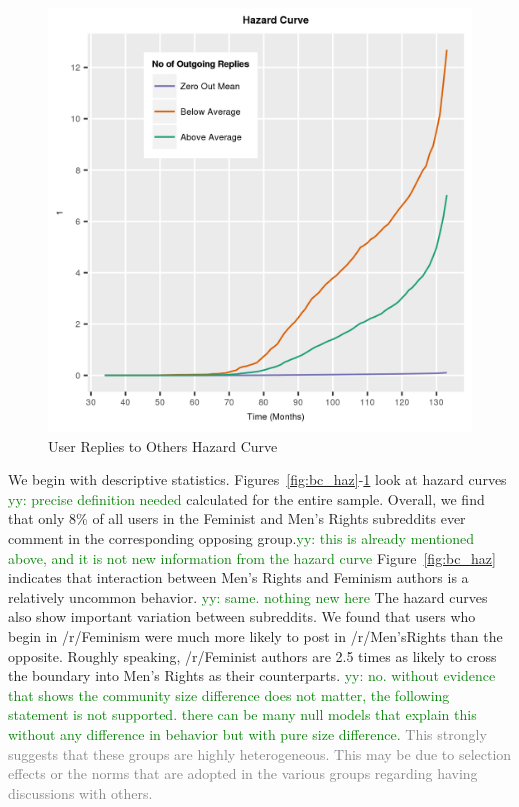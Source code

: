 \documentclass[letterpaper]{article}
\newcommand{\yy}[1]{{\textcolor{green}{yy: #1}}}
\newcommand{\del}[1]{{\textcolor{gray}{#1}}}
\begin{document}
\begin{figure}[ht]{}
\centering
    \includegraphics[scale=0.75]{outmean_Hazard_final}
    \caption{User Replies to Others Hazard Curve}
    \label{fig:outmean_haz}
\end{figure}

We begin with descriptive statistics. Figures~\ref{fig:bc_haz}-\ref{fig:outmean_haz} look at hazard curves \yy{precise definition needed} calculated for the entire sample. Overall, we find that only 8\% of all users in the Feminist and Men's Rights subreddits ever comment in the corresponding opposing group.\yy{this is already mentioned above, and it is not new information from the hazard curve} Figure~\ref{fig:bc_haz} indicates that interaction between Men's Rights and Feminism authors is a relatively uncommon behavior. \yy{same. nothing new here} The hazard curves also show important variation between subreddits. We found that users who begin in /r/Feminism were much more likely to post in /r/Men'sRights than the opposite.  Roughly speaking, /r/Feminist authors are 2.5 times as likely to cross the boundary into Men's Rights as their counterparts. \yy{no. without evidence that shows the community size difference does not matter, the following statement is not supported. there can be many null models that explain this without any difference in behavior but with pure size difference. } \del{This strongly suggests that these groups are highly heterogeneous. This may be due to selection effects or the norms that are adopted in the various groups regarding having discussions with others.}
\end{document}
